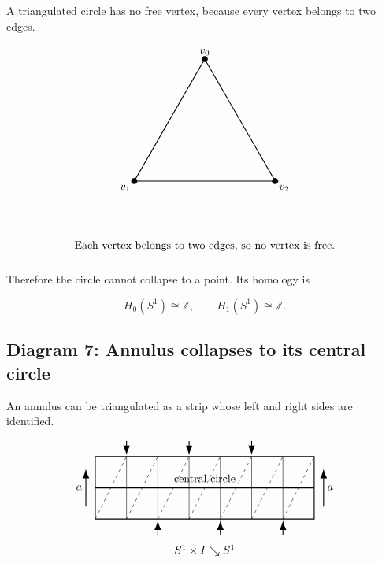 \documentclass[12pt,a4paper]{article}
\theoremstyle{notespace}
\begin{document}
A triangulated circle has no free vertex, because every vertex belongs to two edges.

\[
\begin{tikzpicture}[scale=1.3]
	\coordinate (A) at (90:2);
	\coordinate (B) at (210:2);
	\coordinate (C) at (330:2);
	
	\draw[thick] (A)--(B)--(C)--cycle;
	
	\filldraw (A) circle (2pt);
	\filldraw (B) circle (2pt);
	\filldraw (C) circle (2pt);
	
	\node[above] at (A) {$v_0$};
	\node[below left] at (B) {$v_1$};
	\node[below right] at (C) {$v_2$};
	
	\node at (0,-2.6) {Each vertex belongs to two edges, so no vertex is free.};
\end{tikzpicture}
\]

Therefore the circle cannot collapse to a point. Its homology is

\[
H_0(S^1)\cong \mathbb Z,
\qquad
H_1(S^1)\cong \mathbb Z.
\]

\subsection{Diagram 7: Annulus collapses to its central circle}

An annulus can be triangulated as a strip whose left and right sides are identified.

\[
\begin{tikzpicture}[scale=1.0]
	\draw[thick] (0,0) rectangle (7,2);
	
	\foreach \x in {1,2,3,4,5,6}{
		\draw[thin] (\x,0)--(\x,2);
	}
	
	\foreach \x in {0,1,2,3,4,5,6}{
		\draw[thin,dashed] (\x,0)--(\x+1,2);
	}
	
	\draw[-{Latex[length=3mm]},thick] (1,2.5)--(1,2.05);
	\draw[-{Latex[length=3mm]},thick] (3,2.5)--(3,2.05);
	\draw[-{Latex[length=3mm]},thick] (5,2.5)--(5,2.05);
	
	\draw[-{Latex[length=3mm]},thick] (2,-0.5)--(2,-0.05);
	\draw[-{Latex[length=3mm]},thick] (4,-0.5)--(4,-0.05);
	\draw[-{Latex[length=3mm]},thick] (6,-0.5)--(6,-0.05);
	
	\draw[-{Latex[length=3mm]},thick] (-0.3,0.4)--(-0.3,1.6);
	\draw[-{Latex[length=3mm]},thick] (7.3,0.4)--(7.3,1.6);
	
	\node[left] at (-0.3,1) {$a$};
	\node[right] at (7.3,1) {$a$};
	
	\draw[very thick] (0,1)--(7,1);
	\node at (3.5,1.3) {central circle};
	
	\node at (3.5,-1.0) {$S^1\times I\searrow S^1$};
\end{tikzpicture}
\]
\end{document}
